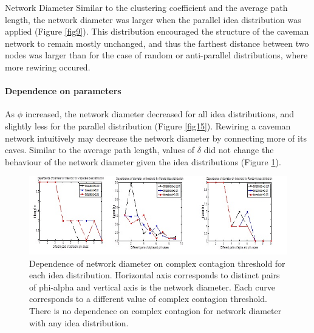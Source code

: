 \documentclass{beamer}
\begin{document}
\begin{frame}
{Network Diameter}
Similar to the clustering coefficient and the average path length, the network diameter was larger when the parallel idea distribution was applied (Figure \ref{fig9}). This distribution encouraged the structure of the caveman network to remain mostly unchanged, and thus the farthest distance between two nodes was larger than for the case of random or anti-parallel distributions, where more rewiring occured. 
\paragraph{Dependence on parameters}
As $\phi$ increased, the network diameter decreased for all idea distributions, and slightly less for the parallel distribution (Figure \ref{fig15}). Rewiring a caveman network intuitively may decrease the network diameter by connecting more of its caves.
Similar to the average path length, values of $\delta$ did not change the behaviour of the network diameter given the idea distributions (Figure \ref{fig18}).

\begin{figure}
[htp]
\begin{center}
\includegraphics{Fig18}
\end{center}
\caption{ Dependence of network diameter on complex contagion threshold for each idea distribution. Horizontal axis corresponds to distinct pairs of phi-alpha and vertical axis is the network diameter. Each curve corresponds to a different value of complex contagion threshold. There is no dependence on complex contagion for network diameter with any idea distribution.}
\label {fig18}
\end{figure}


\end{frame}
\end{document}

